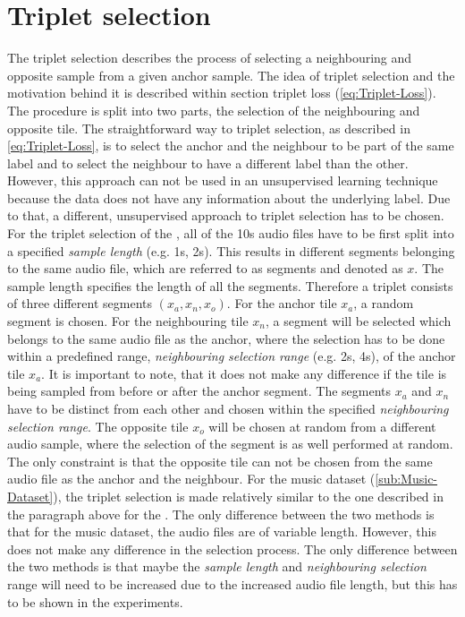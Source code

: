 \section{Triplet selection}
\label{sec:Triplet-Selection}
The triplet selection describes the process of selecting a neighbouring and opposite sample from a given anchor sample. The idea of triplet selection and the motivation behind it is described within section triplet loss (\ref{eq:Triplet-Loss}). The procedure is split into two parts, the selection of the neighbouring and opposite tile.
\newline
\newline
The straightforward way to triplet selection, as described in \ref{eq:Triplet-Loss}, is to select the anchor and the neighbour to be part of the same label and to select the neighbour to have a different label than the other. However, this approach can not be used in an unsupervised learning technique because the data does not have any information about the underlying label. Due to that, a different, unsupervised approach to triplet selection has to be chosen.
\newline
\newline
For the triplet selection of the , all of the 10s audio files have to be first split into a specified \textit{sample length} (e.g. 1s, 2s). This results in different segments belonging to the same audio file, which are referred to as segments and denoted as $x$. The sample length specifies the length of all the segments. Therefore a triplet consists of three different segments $(x_a, x_n, x_o)$.
\newline
For the anchor tile $x_a$, a random segment is chosen. For the neighbouring tile $x_n$, a segment will be selected which belongs to the same audio file as the anchor, where the selection has to be done within a predefined range, \textit{neighbouring selection range} (e.g. 2s, 4s), of the anchor tile $x_a$. It is important to note, that it does not make any difference if the tile is being sampled from before or after the anchor segment. The segments $x_a$ and $x_n$ have to be distinct from each other and chosen within the specified \textit{neighbouring selection range}.
\newline
The opposite tile $x_o$ will be chosen at random from a different audio sample, where the selection of the segment is as well performed at random. The only constraint is that the opposite tile can not be chosen from the same audio file as the anchor and the neighbour.
\newline
\newline
For the music dataset (\ref{sub:Music-Dataset}), the triplet selection is made relatively similar to the one described in the paragraph above for the . The only difference between the two methods is that for the music dataset, the audio files are of variable length. However, this does not make any difference in the selection process. The only difference between the two methods is that maybe the \textit{sample length} and \textit{neighbouring selection} range will need to be increased due to the increased audio file length, but this has to be shown in the experiments.

